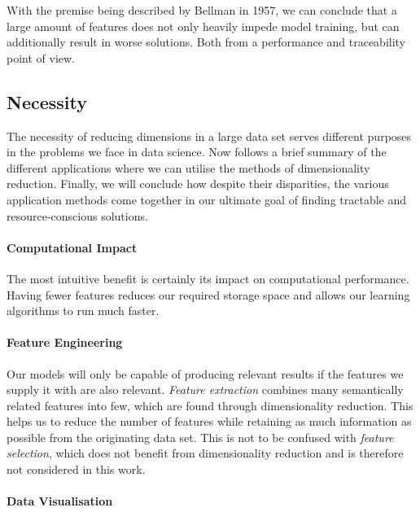 With the premise being described by Bellman in 1957, we can conclude that a large amount of features does not only heavily impede model training, but can additionally result in worse solutions. \cite{HandsOnMLCh8}
Both from a performance and traceability point of view.

\clearpage


\subsection{Necessity}

The necessity of reducing dimensions in a large data set serves different purposes in the problems we face in data science. 
Now follows a brief summary of the different applications where we can utilise the methods of dimensionality reduction. 
Finally, we will conclude how despite their disparities, the various application methods come together in our ultimate goal of finding tractable and resource-conscious solutions.

\paragraph{Computational Impact}

The most intuitive benefit is certainly its impact on computational performance.
Having fewer features reduces our required storage space and allows our learning algorithms to run much faster. \cite{PythonMachineLearningCh1}

\paragraph{Feature Engineering}

Our models will only be capable of producing relevant results if the features we supply it with are also relevant. \cite{HandsOnMLCh1}
\emph{Feature extraction} combines many semantically related features into few, which are found through dimensionality reduction. 
This helps us to reduce the number of features while retaining as much information as possible from the originating data set.
This is not to be confused with \emph{feature selection}, which does not benefit from dimensionality reduction and is therefore not considered in this work.

\paragraph{Data Visualisation}

